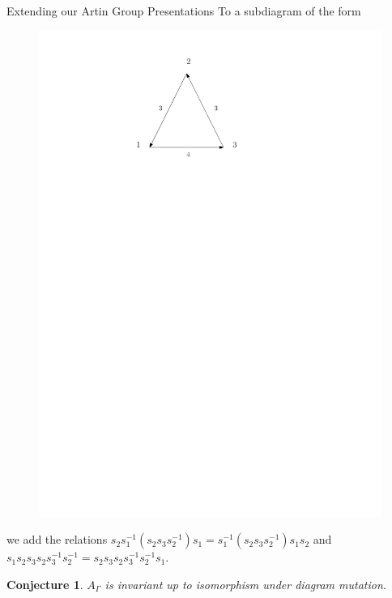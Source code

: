 \documentclass{beamer}
\newtheorem{Conjecture}{Conjecture}
\begin{document}
\begin{frame}{Extending our Artin Group Presentations}
To a subdiagram of the form
\begin{figure}
\includegraphics[scale = .50]{Diagram5.pdf}
\end{figure}
we add the relations $s_{2}s_{1}^{-1}(s_{2}s_{3}s_{2}^{-1})s_{1} = s_{1}^{-1}(s_{2}s_{3}s_{2}^{-1})s_{1}s_{2}$ and $s_{1}s_{2}s_{3}s_{2}s_{3}^{-1}s_{2}^{-1} = s_{2}s_{3}s_{2}s_{3}^{-1}s_{2}^{-1}s_{1}$.
\end{frame}

\begin{frame}
\begin{Conjecture}
$A_{\Gamma}$ is invariant up to isomorphism under diagram mutation.
\end{Conjecture}
\end{frame}
\end{document}
